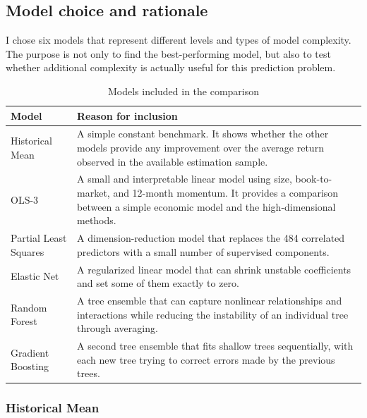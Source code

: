 \documentclass[11pt,a4paper]{article}
\begin{document}
\subsection{Model choice and rationale}

I chose six models that represent different levels and types of model
complexity. The purpose is not only to find the best-performing model, but also
to test whether additional complexity is actually useful for this prediction
problem.

\begin{table}[H]
\centering
\caption{Models included in the comparison}
\label{tab:model-rationale}
\small
\begin{tabularx}
{\textwidth}
{>{\raggedright\arraybackslash}p{2.8cm}X}
\toprule
Model & Reason for inclusion \\
\midrule

Historical Mean &
A simple constant benchmark. It shows whether the other models provide any
improvement over the average return observed in the available estimation
sample. \\

OLS-3 &
A small and interpretable linear model using size, book-to-market, and
12-month momentum. It provides a comparison between a simple economic model
and the high-dimensional methods. \\

Partial Least Squares &
A dimension-reduction model that replaces the 484 correlated predictors with a
small number of supervised components. \\

Elastic Net &
A regularized linear model that can shrink unstable coefficients and set some
of them exactly to zero. \\

Random Forest &
A tree ensemble that can capture nonlinear relationships and interactions while
reducing the instability of an individual tree through averaging. \\

Gradient Boosting &
A second tree ensemble that fits shallow trees sequentially, with each new tree
trying to correct errors made by the previous trees. \\

\bottomrule
\end{tabularx}
\end{table}

\subsubsection*{Historical Mean}
\end{document}

